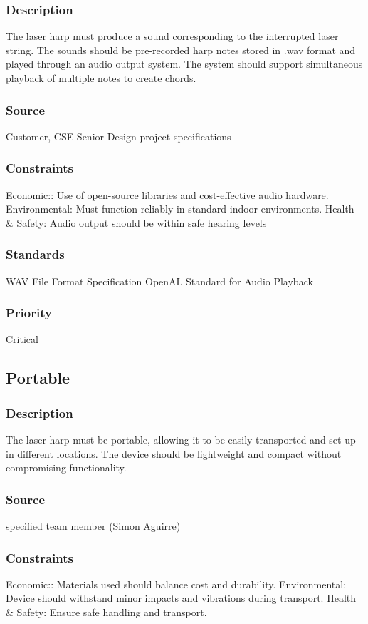 \subsubsection{Description}
The laser harp must produce a sound corresponding to the interrupted laser string. The sounds should be pre-recorded harp notes stored in .wav format and played through an audio output system. The system should support simultaneous playback of multiple notes to create chords.
\subsubsection{Source}
Customer, CSE Senior Design project specifications
\subsubsection{Constraints}
Economic:: Use of open-source libraries and cost-effective audio hardware.
Environmental: Must function reliably in standard indoor environments.
Health & Safety: Audio output should be within safe hearing levels
\subsubsection{Standards}
WAV File Format Specification
OpenAL Standard for Audio Playback
\subsubsection{Priority}
Critical


\subsection{Portable}
\subsubsection{Description}
The laser harp must be portable, allowing it to be easily transported and set up in different locations. The device should be lightweight and compact without compromising functionality.
\subsubsection{Source}
specified team member (Simon Aguirre)
\subsubsection{Constraints}
Economic:: Materials used should balance cost and durability.
Environmental: Device should withstand minor impacts and vibrations during transport.
Health & Safety: Ensure safe handling and transport.
